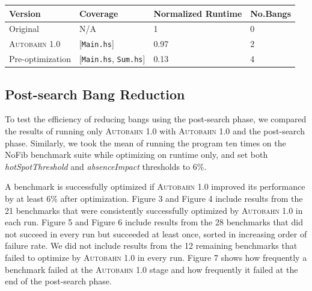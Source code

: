 \documentclass[format=sigplan, review=true]{acmart}
\newcommand{\hotspotcost}[0]{\textit{hotSpotThreshold}}
\newcommand{\Ao}[0]{\textsc{Autobahn 1.0}}
\newcommand{\postopt}[0]{post-search}
\newcommand{\Postopt}[0]{Post-search}
\newcommand{\absim}[0]{\textit{absenceImpact}}
\begin{document}
\begin{tabular}{p{2.5cm}p{1.5cm}p{2cm}p{1cm}}
\hline
Version   & Coverage & Normalized Runtime & No.Bangs \\
\hline
Original      & N/A   &   1	 & 0   \\
\Ao{}       & [\texttt{Main.hs}]      & 0.97    &  2\\
Pre-optimization	& [\texttt{Main.hs}, \texttt{Sum.hs}]         & 0.13      & 4\\
\hline
\end{tabular}


\subsection{\Postopt{} Bang Reduction}

To test the efficiency of reducing bangs using the \postopt{} phase, we compared the results of running only \Ao{} with \Ao{} and the \postopt{} phase. Similarly, we took the mean of running the program ten times on the NoFib benchmark suite while optimizing on runtime only, and set both \hotspotcost{} and \absim{} thresholds to 6\%. 


A benchmark is successfully optimized if \Ao{} improved its performance by at least 6\% after optimization. Figure 3 and Figure 4 include results from the 21 benchmarks that were consistently successfully optimized by \Ao{} in each run. Figure 5 and Figure 6 include results from the 28 benchmarks that did not succeed in every run but succeeded at least once, sorted in increasing order of failure rate. We did not include results from the 12 remaining benchmarks that failed to optimize by \Ao{} in every run. Figure 7 shows how frequently a benchmark failed at the \Ao{} stage and how frequently it failed at the end of the \postopt{} phase.
\end{document}
